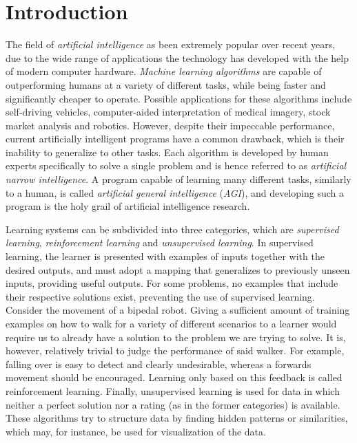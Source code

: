 \section{Introduction}
The field of \textit{artificial intelligence} as been extremely popular over recent years, due to the wide range of applications the technology has developed with the help of modern computer hardware. \textit{Machine learning algorithms} are capable of outperforming humans at a variety of different tasks, while being faster and significantly cheaper to operate. Possible applications for these algorithms include self-driving vehicles, computer-aided interpretation of medical imagery, stock market analysis and robotics. However, despite their impeccable performance, current artificially intelligent programs have a common drawback, which is their inability to generalize to other tasks. Each algorithm is developed by human experts specifically to solve a single problem and is hence referred to as \textit{artificial narrow intelligence}. A program capable of learning many different tasks, similarly to a human, is called \textit{artificial general intelligence} (\textit{AGI}), and developing such a program is the holy grail of artificial intelligence research.

Learning systems can be subdivided into three categories, which are \textit{supervised learning}, \textit{reinforcement learning} and \textit{unsupervised learning}. In supervised learning, the learner is presented with examples of inputs together with the desired outputs, and must adopt a mapping that generalizes to previously unseen inputs, providing useful outputs. For some problems, no examples that include their respective solutions exist, preventing the use of supervised learning. Consider the movement of a bipedal robot. Giving a sufficient amount of training examples on how to walk for a variety of different scenarios to a learner would require us to already have a solution to the problem we are trying to solve. It is, however, relatively trivial to judge the performance of said walker. For example, falling over is easy to detect and clearly undesirable, whereas a forwards movement should be encouraged. Learning only based on this feedback is called reinforcement learning. Finally, unsupervised learning is used for data in which neither a perfect solution nor a rating (as in the former categories) is available. These algorithms try to structure data by finding hidden patterns or similarities, which may, for instance, be used for visualization of the data.
